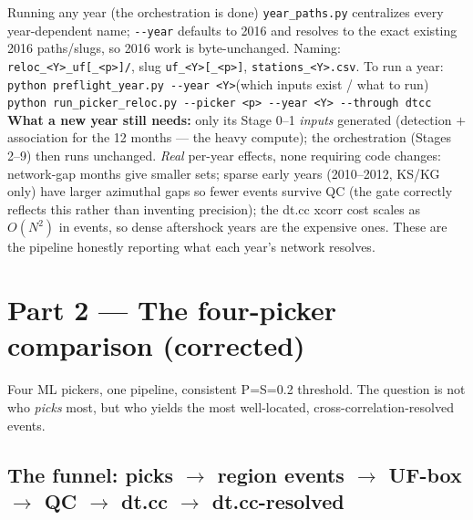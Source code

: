 \documentclass[11pt]{article}
\begin{document}
\begin{keybox}{Running any year (the orchestration is done)}
\texttt{year\_paths.py} centralizes every year-dependent name; \texttt{-{}-year} defaults to 2016 and resolves
to the exact existing 2016 paths/slugs, so 2016 work is byte-unchanged. Naming: \texttt{reloc\_<Y>\_uf[\_<p>]/},
slug \texttt{uf\_<Y>[\_<p>]}, \texttt{stations\_<Y>.csv}. To run a year:\\[1mm]
\hspace*{3mm}\texttt{python preflight\_year.py -{}-year <Y>}\hfill (which inputs exist / what to run)\\
\hspace*{3mm}\texttt{python run\_picker\_reloc.py -{}-picker <p> -{}-year <Y> -{}-through dtcc}\\[1mm]
\textbf{What a new year still needs:} only its Stage 0--1 \emph{inputs} generated (detection $+$ association for
the 12 months --- the heavy compute); the orchestration (Stages 2--9) then runs unchanged. \emph{Real} per-year
effects, none requiring code changes: network-gap months give smaller sets; sparse early years (2010--2012,
KS/KG only) have larger azimuthal gaps so fewer events survive QC (the gate correctly reflects this rather than
inventing precision); the dt.cc xcorr cost scales as $O(N^2)$ in events, so dense aftershock years are the
expensive ones. These are the pipeline honestly reporting what each year's network resolves.
\end{keybox}

\section{Part 2 — The four-picker comparison (corrected)}

Four ML pickers, one pipeline, consistent P{=}S{=}0.2 threshold. The question is not who \emph{picks}
most, but who yields the most well-located, cross-correlation-resolved events.

\subsection{The funnel: picks $\rightarrow$ region events $\rightarrow$ UF-box $\rightarrow$ QC $\rightarrow$ dt.cc $\rightarrow$ dt.cc-resolved}
\end{document}
